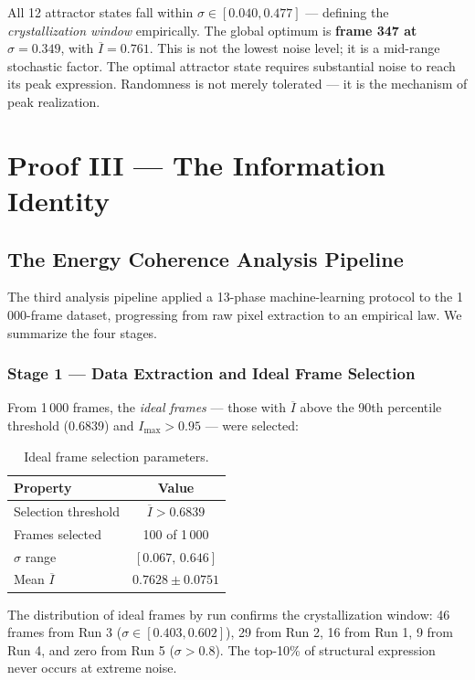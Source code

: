 \documentclass[twocolumn,amsmath,amssymb,prl]{revtex4-2}
\begin{document}
All 12 attractor states fall within $\sigma \in [0.040, 0.477]$ — defining
the \emph{crystallization window} empirically.  The global optimum is
\textbf{frame 347 at $\sigma = 0.349$}, with $\overline{I} = 0.761$.
This is not the lowest noise level; it is a mid-range stochastic factor.
The optimal attractor state requires substantial noise to reach its peak
expression.  Randomness is not merely tolerated — it is the mechanism of
peak realization.

\section{Proof III — The Information Identity}
\label{sec:identity}

\subsection{The Energy Coherence Analysis Pipeline}

The third analysis pipeline applied a 13-phase machine-learning protocol to
the 1\,000-frame dataset, progressing from raw pixel extraction to an
empirical law.  We summarize the four stages.

\subsubsection{Stage 1 — Data Extraction and Ideal Frame Selection}

From 1\,000 frames, the \emph{ideal frames} — those with $\overline{I}$ above
the 90th percentile threshold (0.6839) and $I_{\max} > 0.95$ — were
selected:

\begin{table}[h]
\centering
\caption{Ideal frame selection parameters.}
\label{tab:idealframes}
\begin{tabular}{lc}
\toprule
Property & Value \\
\midrule
Selection threshold & $\overline{I} > 0.6839$ \\
Frames selected & 100 of 1\,000 \\
$\sigma$ range & $[0.067,\, 0.646]$ \\
Mean $\overline{I}$ & $0.7628 \pm 0.0751$ \\
\bottomrule
\end{tabular}
\end{table}

The distribution of ideal frames by run confirms the crystallization window:
46 frames from Run 3 ($\sigma \in [0.403, 0.602]$), 29 from Run 2, 16 from
Run 1, 9 from Run 4, and zero from Run 5 ($\sigma > 0.8$).  The top-10\% of
structural expression never occurs at extreme noise.
\end{document}
